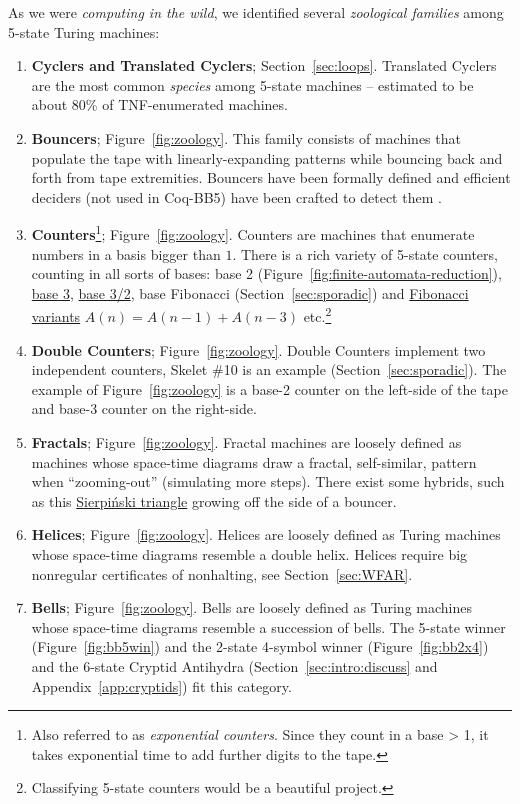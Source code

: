 \documentclass[a4paper,british]{article}
\theoremstyle{definition} %
\numberwithin{equation}{section}
\theoremstyle{definition} %
\newcommand{\CoqBB}{Coq-BB5\xspace}
\begin{document}
As we were \textit{computing in the wild}, we identified several \textit{zoological families} among 5-state Turing machines:

\begin{enumerate}
    \item \textbf{Cyclers and Translated Cyclers}; Section~\ref{sec:loops}. Translated Cyclers are the most common \textit{species} among 5-state machines -- estimated to be about 80\% of TNF-enumerated machines.
    \item \textbf{Bouncers}; Figure~\ref{fig:zoology}. This family consists of machines that populate the tape with linearly-expanding patterns while bouncing back and forth from tape extremities. Bouncers have been formally defined and efficient deciders (not used in \CoqBB) have been crafted to detect them \cite{bbchallenge_part1}.
    \item \textbf{Counters}\footnote{Also referred to as \textit{exponential counters}. Since they count in a base > 1, it takes exponential time to add further digits to the tape.}; Figure~\ref{fig:zoology}. Counters are machines that enumerate numbers in a basis bigger than $1$. There is a rich variety of 5-state counters, counting in all sorts of bases: base 2 (Figure~\ref{fig:finite-automata-reduction}), \href{https://bbchallenge.org/1RB1RB_1RC0LD_1LD1RA_---1LE_0RA0LE }{base 3}, \href{https://bbchallenge.org/1LB1RC_0LE0RA_1LD1RA_0RA1LB_0RD0LB}{base 3/2}, base Fibonacci (Section~\ref{sec:sporadic}) and \href{https://bbchallenge.org/1RB1RA_0LC1LC_0RD1LD_0RA0LB}{Fibonacci variants} $A(n) = A(n-1) + A(n-3)$ etc.\footnote{Classifying 5-state counters would be a beautiful project.}
    \item \textbf{Double Counters}; Figure~\ref{fig:zoology}. Double Counters implement two independent counters, Skelet \#10 is an example (Section~\ref{sec:sporadic}). The example of Figure~\ref{fig:zoology} is a base-2 counter on the left-side of the tape and base-3 counter on the right-side.
    \item \textbf{Fractals}; Figure~\ref{fig:zoology}. Fractal machines are loosely defined as machines whose space-time diagrams draw a fractal, self-similar, pattern when ``zooming-out'' (\ie simulating more steps). There exist some hybrids, such as this \href{https://bbchallenge.org/1RB1RC_1RC1RB_1LD0RA_---1LE_0LD0LA&s=20000}{Sierpiński triangle} growing off the side of a bouncer.
    \item \textbf{Helices}; Figure~\ref{fig:zoology}. Helices are loosely defined as Turing machines whose space-time diagrams resemble a double helix. Helices require big nonregular certificates of nonhalting, see Section~\ref{sec:WFAR}.
    \item \textbf{Bells}; Figure~\ref{fig:zoology}. Bells are loosely defined as Turing machines whose space-time diagrams resemble a succession of bells. The 5-state winner (Figure~\ref{fig:bb5win}) and the 2-state 4-symbol winner (Figure~\ref{fig:bb2x4}) and the 6-state Cryptid Antihydra (Section~\ref{sec:intro:discuss} and Appendix~\ref{app:cryptids}) fit this category.
\end{enumerate}
\end{document}
